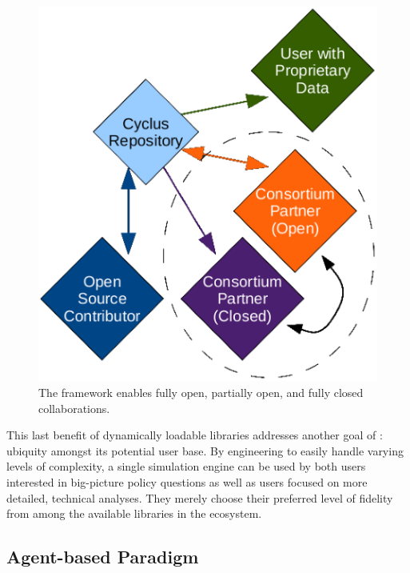 \begin{figure}[htbp!]
\begin{center}
\includegraphics{./images/modifiedopen.eps}
\end{center}
\caption{The \Cyclus framework enables fully open, partially open, and fully
closed collaborations\cite{carlsen_cyclus_2014}.}
\label{fig:modifiedopen}
\end{figure}

This last benefit of dynamically loadable libraries addresses
another goal of \Cyclus: ubiquity amongst its potential user base. By
engineering \Cyclus to easily handle varying levels of complexity, a single
simulation engine can be used by both users interested in big-picture policy
questions as well as users focused on more detailed, technical
analyses. They merely choose their preferred level of fidelity from among the
available libraries in the ecosystem.

\subsection{Agent-based Paradigm}

